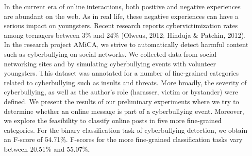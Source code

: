 \documentclass[10pt, a4paper, twopage, headinclude, footinclude, BCOR5mm]{book}
\begin{document}
\begin{table}[t!]
\end{table} 
\noindent
In the current era of online interactions, both positive and negative experiences are abundant on the web. As in real life, these negative experiences can have a serious impact on youngsters. Recent research reports cybervictimization rates among teenagers between 3\% and 24\% (Olweus, 2012; Hinduja \& Patchin, 2012). In the research project AMiCA, we strive to automatically detect harmful content such as cyberbullying on social networks. We collected data from social networking sites and by simulating cyberbullying events with volunteer youngsters. This dataset was annotated for a number of fine-grained categories related to cyberbullying such as insults and threats. More broadly, the severity of cyberbullying, as well as the author's role (harasser, victim or bystander) were defined. We present the results of our preliminary experiments where we try to determine whether an online message is part of a cyberbullying event. Moreover, we explore the feasibility to classify online posts in five more fine-grained categories. For the binary classification task of cyberbullying detection, we obtain an F-score of 54.71\%. F-scores for the more fine-grained classification tasks vary between 20.51\% and 55.07\%.  
\end{document}
